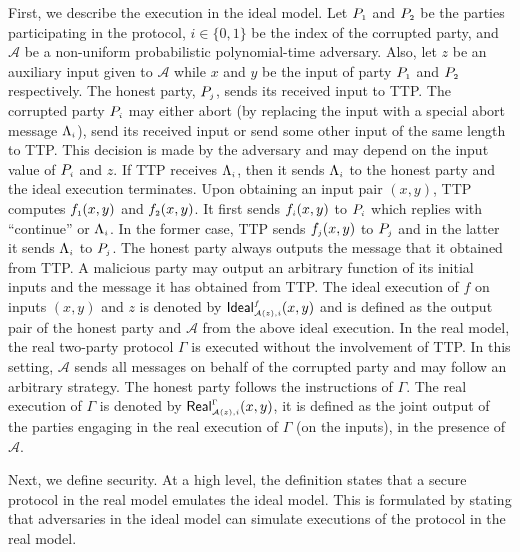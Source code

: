 First, we describe the execution in the ideal model. Let $P_{\scriptscriptstyle 1}$ and $P_{\scriptscriptstyle 2}$ be the parties participating in the
protocol, $i\in \{0, 1\}$ be the index of the corrupted party, and $\mathcal A$ be a non-uniform
probabilistic polynomial-time adversary. Also, let $z$ be an auxiliary input given to $\mathcal A$ while  $x$ and $y$ be the input of party $P_{\scriptscriptstyle 1}$ and $P_{\scriptscriptstyle 2}$  respectively.  The honest party, $P_{\scriptscriptstyle j}$, sends its received input to TTP.  The corrupted party $P_{\scriptscriptstyle i}$ may either abort (by replacing the input with a special abort message $\Lambda_{\scriptscriptstyle i}$),  send its received input or send some other input of the same length to TTP. This decision is made by the adversary and may depend on the input value of $P_{\scriptscriptstyle i}$ and $z$. If TTP receives $\Lambda_{\scriptscriptstyle i}$, then it sends $\Lambda_{\scriptscriptstyle i}$ to the honest party and the ideal execution terminates.  Upon obtaining an input pair $(x, y)$, TTP computes $f_{\scriptscriptstyle 1}(x, y)$ and $f_{\scriptscriptstyle 2}(x, y)$. It first sends $f_{\scriptscriptstyle i}(x, y)$ to  $P_{\scriptscriptstyle i}$ which replies with ``continue'' or $\Lambda_{\scriptscriptstyle i}$. In the former case, TTP sends  $f_{\scriptscriptstyle j}(x, y)$ to  $P_{\scriptscriptstyle j}$ and in the latter it sends $\Lambda_{\scriptscriptstyle i}$ to  $P_{\scriptscriptstyle j}$. The honest party always outputs the message that it obtained from TTP. A malicious party may output an arbitrary function of its initial inputs and the message it has obtained from TTP.  The ideal execution of $f$ on inputs $(x, y)$ and $z$ is denoted by $\mathsf{Ideal}^{\scriptscriptstyle f}_{\scriptscriptstyle\mathcal{A}(z), i}(x,y)$ and is defined as the output pair of the honest party and $\mathcal{A}$ from the above ideal execution.  In the real model, the real two-party protocol $\Gamma$ is executed
without the involvement of TTP. In this setting, $\mathcal{A}$ sends all messages on
behalf of the corrupted party and may follow an arbitrary strategy.
The honest party follows the instructions of $\Gamma$. The real execution of $\Gamma$ is denoted by $\mathsf{Real}^{\scriptscriptstyle \Gamma}_{\scriptscriptstyle\mathcal{A}(z), i}(x,y)$, it is defined as the joint output of the parties engaging in the real execution of $\Gamma$ (on the inputs), in the presence of $\mathcal{A}$.
 
 
 Next, we define security. At a high level, the definition states that a secure protocol in the real model emulates the ideal model. This is formulated by stating that adversaries in the ideal model can simulate executions of the protocol in the real model. 
 
